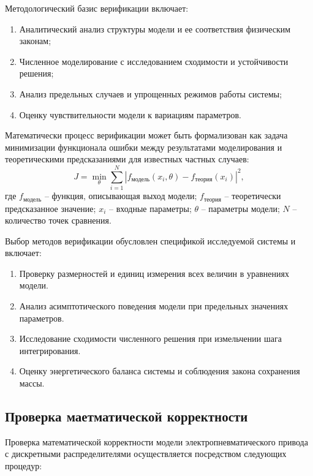 Методологический базис верификации включает:

\begin{enumerate}
    \item Аналитический анализ структуры модели и ее соответствия физическим законам;
    \item Численное моделирование с исследованием сходимости и устойчивости решения;
    \item Анализ предельных случаев и упрощенных режимов работы системы;
    \item Оценку чувствительности модели к вариациям параметров.
\end{enumerate}

Математически процесс верификации может быть формализован как задача минимизации функционала
ошибки между результатами моделирования и теоретическими предсказаниями для известных частных случаев:
\begin{equation*}
    J = \min_{\theta} \sum_{i=1}^{N} \left| f_{\text{модель}}(x_i, \theta) - f_{\text{теория}}(x_i) \right|^2,
\end{equation*}
где $f_{\text{модель}}$ -- функция, описывающая выход модели;
$f_{\text{теория}}$ -- теоретически предсказанное значение;
$x_i$ -- входные параметры;
$\theta$ -- параметры модели;
$N$ -- количество точек сравнения.

Выбор методов верификации обусловлен спецификой исследуемой системы и включает:

\begin{enumerate}
    \item Проверку размерностей и единиц измерения всех величин в уравнениях модели.
    \item    Анализ асимптотического поведения модели при предельных значениях параметров.
    \item Исследование сходимости численного решения при измельчении шага интегрирования.
    \item Оценку энергетического баланса системы и соблюдения закона сохранения массы.
\end{enumerate}

\subsection{Проверка маетматической корректности}\label{sec:ch2/sec7/subsec2}

Проверка математической корректности модели электропневматического привода с дискретными распределителями осуществляется посредством следующих процедур:

